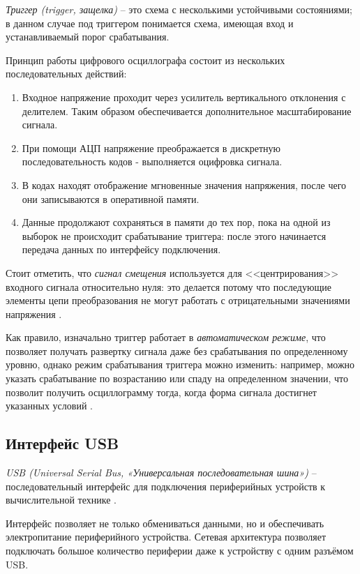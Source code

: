 \emph{Триггер (trigger, защелка)} -- это схема с несколькими устойчивыми состояниями; в данном случае под триггером понимается схема, имеющая вход и устанавливаемый порог срабатывания.

Принцип работы цифрового осциллографа состоит из нескольких последовательных действий:
\begin{enumerate}

    \item Входное напряжение проходит через усилитель вертикального отклонения с делителем. Таким образом обеспечивается дополнительное масштабирование сигнала.

    \item При помощи АЦП напряжение преображается в дискретную последовательность кодов - выполняется оцифровка сигнала.

    \item В кодах находят отображение мгновенные значения напряжения, после чего они записываются в оперативной памяти.

    \item Данные продолжают сохраняться в памяти до тех пор, пока на одной из выборок не происходит срабатывание триггера: после этого начинается передача данных по интерфейсу подключения.
\end{enumerate}

Стоит отметить, что \emph{сигнал смещения} используется для <<центрирования>> входного сигнала относительно нуля: это делается потому что последующие элементы цепи преобразования не могут работать с отрицательными значениями напряжения \cite{clamper}.

Как правило, изначально триггер работает в \emph{автоматическом режиме}, что позволяет получать развертку сигнала даже без срабатывания по определенному уровню, однако
режим срабатывания триггера можно изменить: например, можно указать срабатывание по возрастанию или спаду на определенном значении, что позволит получить осциллограмму тогда, когда форма сигнала достигнет указанных условий \cite{trigger}.

\subsection{Интерфейс USB}

\emph{USB (Universal Serial Bus, «Универсальная последовательная шина»)} -- последовательный интерфейс для подключения периферийных устройств к вычислительной технике \cite{usb}.

Интерфейс позволяет не только обмениваться данными, но и обеспечивать электропитание периферийного устройства. Сетевая архитектура позволяет подключать большое количество периферии даже к устройству с одним разъёмом USB.

